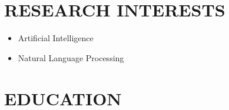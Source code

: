 
\section{RESEARCH INTERESTS}
\begin{itemize}
	\item Artificial Intelligence
	\item Natural Language Processing

\end{itemize}

\section{EDUCATION}

